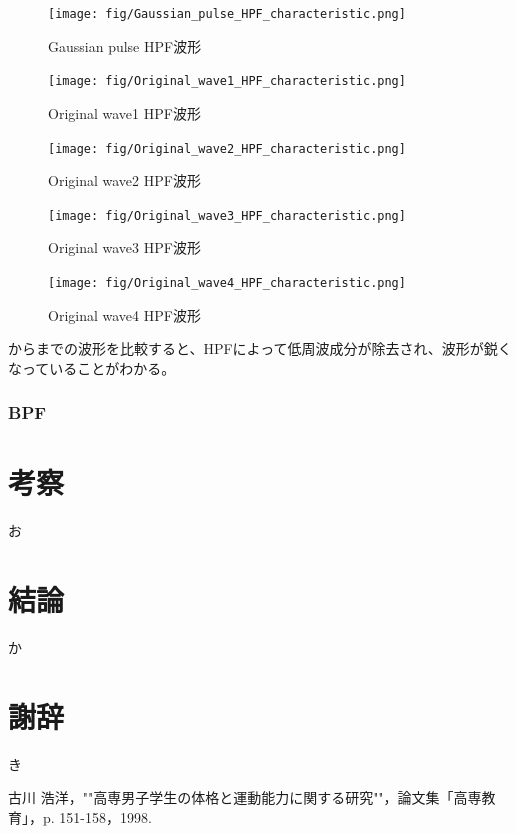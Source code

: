 \documentclass[11pt,dvipdfmx]{jarticle}
\begin{document}
\begin{figure}[H]
  \centering
  \texttt{[image: fig/Gaussian\_pulse\_HPF\_characteristic.png]}
  \caption{Gaussian pulse HPF波形}
  \label{fig:Gaussian_pulse_HPF}
\end{figure}
\begin{figure}[H]
  \centering
  \texttt{[image: fig/Original\_wave1\_HPF\_characteristic.png]}
  \caption{Original wave1 HPF波形}
  \label{fig:Original_wave1_HPF}
\end{figure}
\begin{figure}[H]
  \centering
  \texttt{[image: fig/Original\_wave2\_HPF\_characteristic.png]}
  \caption{Original wave2 HPF波形}
  \label{fig:Original_wave2_HPF}
\end{figure}
\begin{figure}[H]
  \centering
  \texttt{[image: fig/Original\_wave3\_HPF\_characteristic.png]}
  \caption{Original wave3 HPF波形}
  \label{fig:Original_wave3_HPF}
\end{figure}
\begin{figure}[H]
  \centering
  \texttt{[image: fig/Original\_wave4\_HPF\_characteristic.png]}
  \caption{Original wave4 HPF波形}
  \label{fig:Original_wave4_HPF}
\end{figure}
からまでの波形を比較すると、HPFによって低周波成分が除去され、波形が鋭くなっていることがわかる。
\subsubsection{BPF}
\section{考察}
お

\section{結論}
か

\section{謝辞}
き


\begin{thebibliography}{99}
 古川 浩洋，""高専男子学生の体格と運動能力に関する研究""，論文集「高専教育」，p. 151-158，1998.
\end{thebibliography}
\end{document}
